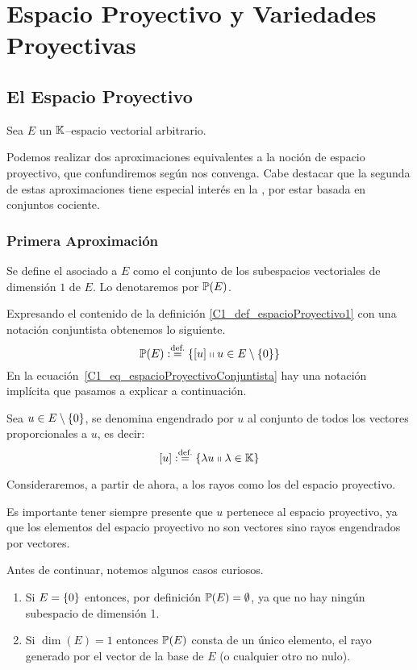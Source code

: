 \chapter{Espacio Proyectivo y Variedades Proyectivas}
\label{C1}
\section{El Espacio Proyectivo}
\label{C1_espacioProyectivo}
Sea $E$ un $\mathbb{K}$--espacio vectorial arbitrario.

Podemos realizar dos aproximaciones equivalentes a la noción de espacio proyectivo, que confundiremos según nos convenga. Cabe destacar que la segunda de estas aproximaciones tiene especial interés en la , por estar basada en conjuntos cociente.
\subsection{Primera Aproximación}
\label{C1_S1_primeraAprox}
\begin{defi}
	\label{C1_def_espacioProyectivo1}
	Se define el  asociado a $E$ como el conjunto de los subespacios vectoriales de dimensión $1$ de $E$. Lo denotaremos por $\mathbb{P}(E)$.
\end{defi}
Expresando el contenido de la definición \ref{C1_def_espacioProyectivo1} con una notación conjuntista obtenemos lo siguiente.
\begin{equation}
\label{C1_eq_espacioProyectivoConjuntista}
	\mathbb{P}(E):\stackrel{\textrm{def.}}{=}\{\left [ u \right ]\shortparallel u\in E\setminus\{0\}\}
\end{equation}
En la ecuación~\eqref{C1_eq_espacioProyectivoConjuntista} hay una notación implícita que pasamos a explicar a continuación.
\begin{defi}[Rayo]
	\label{C1_def_rayo}
	Sea $u\in E\setminus\{0\}$, se denomina  engendrado por $u$ al conjunto de todos los vectores proporcionales a $u$, es decir:
	\[\left [ u \right ]:\stackrel{\textrm{def.}}{=}\{\lambda u\shortparallel \lambda\in\mathbb{K}\}\] 
\end{defi}
Consideraremos, a partir de ahora, a los rayos como los  del espacio proyectivo.

Es importante tener siempre presente que $u$  pertenece al espacio proyectivo, ya que los elementos del espacio proyectivo no son vectores sino rayos engendrados por vectores.

Antes de continuar, notemos algunos casos curiosos.
\begin{obs}
	\label{C1_obs_casosExtremos}
	\begin{enumerate}
		\item Si $E=\{0\}$ entonces, por definición $\mathbb{P}(E)=\emptyset$, ya que no hay ningún subespacio de dimensión 1.
		\item Si $\dim(E)=1$ entonces $\mathbb{P}(E)$ consta de un único elemento, el rayo generado por el vector de la base de $E$ (o cualquier otro no nulo).
	\end{enumerate}
\end{obs}
